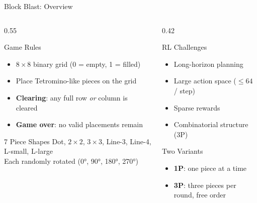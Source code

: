 \documentclass[aspectratio=169,10pt]{beamer}
\begin{document}
\begin{frame}{Block Blast: Overview}
\begin{columns}[T]
\begin{column}{0.55\textwidth}
\begin{block}{Game Rules}
\begin{itemize}
    \item $8\times8$ binary grid (0 = empty, 1 = filled)
    \item Place Tetromino-like pieces on the grid
    \item \textbf{Clearing}: any full row \emph{or} column is cleared
    \item \textbf{Game over}: no valid placements remain
\end{itemize}
\end{block}

\vspace{0.4em}
\begin{block}{7 Piece Shapes}
Dot, $2\times2$, $3\times3$, Line-3, Line-4, L-small, L-large\\
\footnotesize Each randomly rotated (0°, 90°, 180°, 270°)
\end{block}
\end{column}

\begin{column}{0.42\textwidth}
\begin{alertblock}{RL Challenges}
\begin{itemize}
    \item Long-horizon planning
    \item Large action space ($\leq 64$ / step)
    \item Sparse rewards
    \item Combinatorial structure (3P)
\end{itemize}
\end{alertblock}

\vspace{0.4em}
\begin{exampleblock}{Two Variants}
\begin{itemize}
    \item \textbf{1P}: one piece at a time
    \item \textbf{3P}: three pieces per round, free order
\end{itemize}
\end{exampleblock}
\end{column}
\end{columns}
\end{frame}
\end{document}
